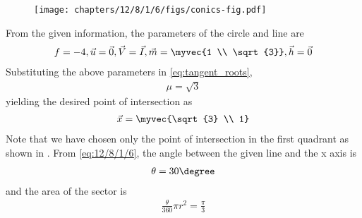 	\begin{figure}[H]
		\centering
 \texttt{[image: chapters/12/8/1/6/figs/conics-fig.pdf]} 
		\caption{}
		\label{fig:12/8/1/6}
  	\end{figure}
  From the given information, the parameters of the  circle and line are
                      \begin{align}
			      f= -4, \vec{u}=\vec{0}, \vec{V}=\vec{I}, \vec{m}=\myvec{1 \\ \sqrt{3}}, \vec{h} = \vec{0}
		\label{eq:12/8/1/6}
                    \end{align}                                                                              
Substituting		    the above parameters in  
\eqref{eq:tangent_roots},
	  \begin{align}                                                                               
		  \mu= \sqrt{3}
	  \end{align}
	  yielding  
the desired point of intersection as                                               
\begin{align}
	\vec{x} = \myvec{\sqrt{3} \\ 1}                               
\end{align}
Note that we have chosen only the point of intersection in the first quadrant as shown in 
		.
From
		\eqref{eq:12/8/1/6},
		the angle between the given line and the x axis is
\begin{align}
	\theta=30\degree
\end{align} 
and
the area of the sector is 
\begin{align}
	{\frac{\theta}{360}}\pi r^2=
	\frac{\pi}{3}
\end{align}
